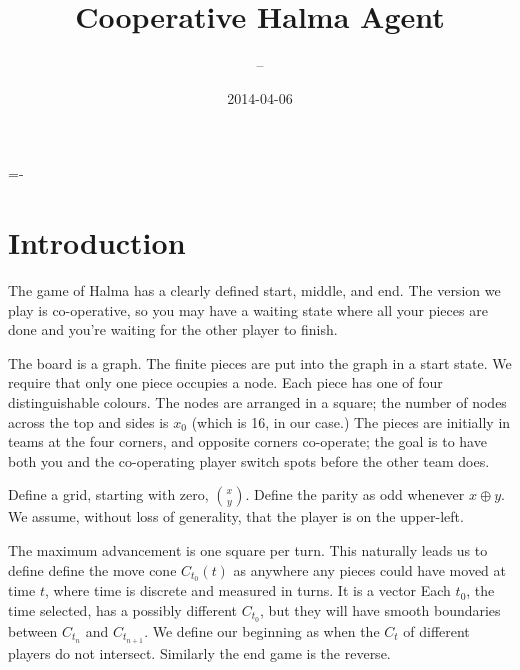 \documentclass[twocolumn]{article}
\author{\name~--~\id}
\title{Cooperative Halma Agent}
\date{2014-04-06}
\def\xor{\oplus} %
\begin{document}
\abovedisplayskip=-\baselineskip

\maketitle



\section{Introduction}

The game of Halma has a clearly defined start, middle, and end.\cite{whitehill2002halma} The version we play is co-operative, so you may have a waiting state where all your pieces are done and you're waiting for the other player to finish.

The board is a graph. The finite pieces are put into the graph in a start state. We require that only one piece occupies a node. Each piece has one of four distinguishable colours. The nodes are arranged in a square; the number of nodes across the top and sides is $x_{0}$ (which is 16, in our case.) The pieces are initially in teams at the four corners, and opposite corners co-operate; the goal is to have both you and the co-operating player switch spots before the other team does.

Define a grid, starting with zero, $\binom{x}{y}$. Define the parity as odd whenever $x \xor y$. We assume, without loss of generality, that the player is on the upper-left.

The maximum advancement is one square per turn.
This naturally leads us to define define the move cone $C_{t_{0}}(t)$ as anywhere any pieces could have moved at time $t$, where time is discrete and measured in turns. It is a vector  Each $t_{0}$, the time selected, has a possibly different $C_{t_{0}}$, but they will have smooth boundaries between $C_{t_{n}}$ and $C_{t_{n+1}}$. We define our beginning as when the $C_{t}$ of different players do not intersect. Similarly the end game is the reverse.
\end{document}
